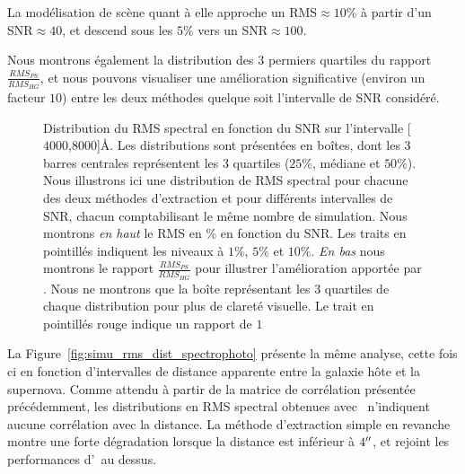 \documentclass[../main/main.tex]{subfiles}
\begin{document}
La modélisation de scène quant à elle
approche un RMS$\approx10\%$ à partir d'un SNR$\approx40$, et
descend sous les $5\%$ vers un SNR$\approx100$. 

Nous montrons également la distribution des 3 permiers quartiles du
rapport $\frac{RMS_{PS}}{RMS_{HG}}$, et nous pouvons visualiser une
amélioration significative (environ un facteur $10$) entre les deux
méthodes quelque soit l'intervalle de SNR considéré. 

\begin{figure}[ht]
  \centering
  \caption[Distribution du RMS spectral en fonction du SNR.]{Distribution du RMS spectral en fonction du SNR  sur l'intervalle [$4000$,$8000$]\AA. Les
    distributions sont présentées en boîtes, dont les 3 barres
    centrales représentent les 3 quartiles ($25\%$, médiane et $50\%$). Nous illustrons ici une
    distribution de RMS spectral pour chacune des deux méthodes
    d'extraction et pour différents intervalles de SNR, chacun comptabilisant le
    même nombre de simulation. Nous montrons \emph{en haut} le RMS en $\%$
    en fonction du SNR. Les traits en pointillés indiquent les niveaux à
    $1\%$, $5\%$ et $10\%$. \emph{En bas} nous montrons le rapport
    $\frac{RMS_{PS}}{RMS_{HG}}$ pour illustrer l'amélioration apportée par
    \hypergal. Nous ne montrons que la boîte représentant les 3 quartiles de
    chaque distribution pour plus de clareté visuelle. Le trait en
    pointillés rouge indique un rapport de $1$}
  \label{fig:simu_rms_snr_spectrophoto}
\end{figure}

La Figure~\ref{fig:simu_rms_dist_spectrophoto} présente la même analyse,
cette fois ci en fonction d'intervalles de distance apparente entre la
galaxie hôte et la supernova. Comme attendu à partir de la matrice de
corrélation présentée précédemment, les distributions en RMS spectral
obtenues avec \hypergal\ n'indiquent aucune corrélation avec la
distance. La méthode d'extraction simple en revanche montre une
forte dégradation lorsque la distance est inférieur à $4^{\prime\prime}$, et
rejoint les performances d'\hypergal\ au dessus.
\end{document}
